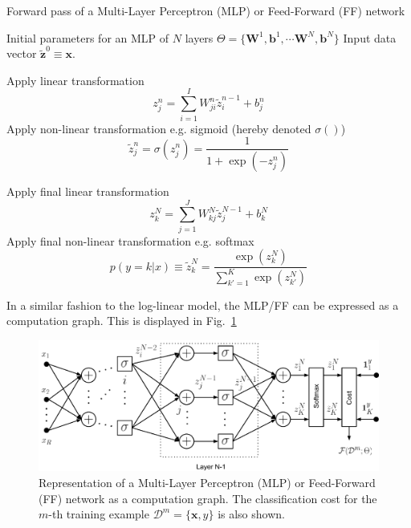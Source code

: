 \begin{algorithm}[th!]
   \caption{Forward pass of a Multi-Layer Perceptron (MLP) or Feed-Forward (FF) network}
\begin{algorithmic}[1]
\label{algo:mlpforward}

    Initial parameters for an MLP of $N$ layers $\Theta=\{\mathbf{W}^1, \mathbf{b}^1, \cdots \mathbf{W}^N, \mathbf{b}^N\}$
    Input data vector $\mathbf{\tilde{z}}^{0}  \equiv \mathbf{x}$. 

     \STATE Apply  linear transformation 
        $$z_j^n = \sum_{i=1}^{I} W_{ji}^n \tilde{z}_i^{n-1} + b_j^n$$
     \STATE Apply non-linear transformation e.g. sigmoid (hereby denoted $\sigma()$)
     $$\tilde{z}_j^n = \sigma(z_j^n)  = \frac{1}{1+\exp(-z_j^n)}$$

	\ENDFOR

\STATE Apply final linear transformation 
   $$z_k^N = \sum_{j=1}^{J} W_{kj}^N \tilde{z}_j^{N-1} + b_k^N$$
\STATE Apply final non-linear transformation e.g. softmax 
$$p(y=k|{x}) \equiv \tilde{z}_k^N = \frac{\exp(z_k^N)}{\sum_{k'=1}^{K} \exp(z_{k'}^N)}$$

\end{algorithmic}
\end{algorithm}

\noindent In a similar fashion to the log-linear model, the MLP/FF can be expressed as a computation graph. This is displayed in Fig.~\ref{fig:FF}

\begin{figure}[!hb]
\centering
\includegraphics[scale=0.6]{figs/deep_learning/NN.pdf}
\caption{Representation of a Multi-Layer Perceptron (MLP) or Feed-Forward (FF) network as a computation graph. The classification cost
for the $m$-th training example $\mathcal{D}^m=\{\mathbf{x}, y\}$ is also
shown.}
\label{fig:FF}
\end{figure}

